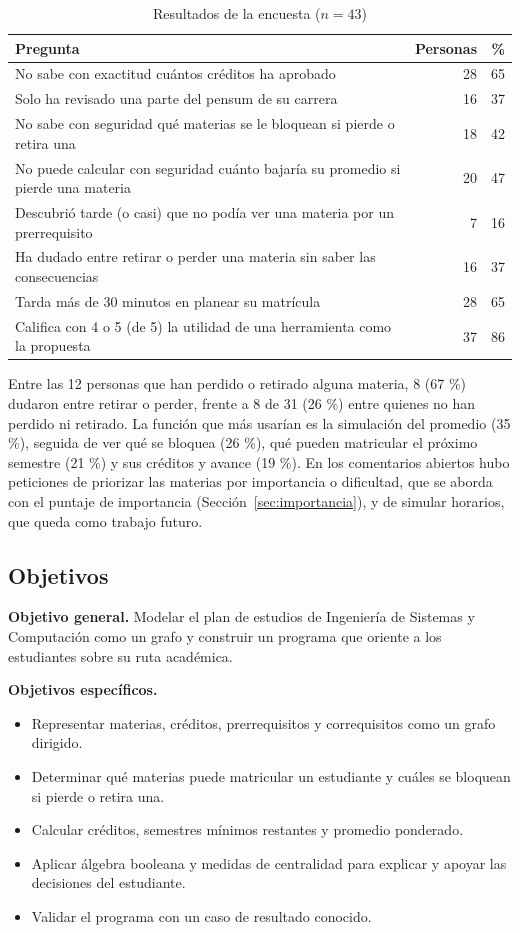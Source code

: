 \documentclass[11pt,a4paper]{article}
\begin{document}
\begin{table}[htbp]
\centering
\caption{Resultados de la encuesta ($n=43$)}
\label{tab:encuesta}
\begin{tabular}{p{9.6cm}rr}
\toprule
Pregunta & Personas & \% \\
\midrule
No sabe con exactitud cuántos créditos ha aprobado & 28 & 65 \\
Solo ha revisado una parte del pensum de su carrera & 16 & 37 \\
No sabe con seguridad qué materias se le bloquean si pierde o retira una & 18 & 42 \\
No puede calcular con seguridad cuánto bajaría su promedio si pierde una materia & 20 & 47 \\
Descubrió tarde (o casi) que no podía ver una materia por un prerrequisito & 7 & 16 \\
Ha dudado entre retirar o perder una materia sin saber las consecuencias & 16 & 37 \\
Tarda más de 30 minutos en planear su matrícula & 28 & 65 \\
Califica con 4 o 5 (de 5) la utilidad de una herramienta como la propuesta & 37 & 86 \\
\bottomrule
\end{tabular}
\end{table}

Entre las 12 personas que han perdido o retirado alguna materia, 8 (67 \%) dudaron entre retirar o perder, frente a 8 de 31 (26 \%) entre quienes no han perdido ni retirado. La función que más usarían es la simulación del promedio (35 \%), seguida de ver qué se bloquea (26 \%), qué pueden matricular el próximo semestre (21 \%) y sus créditos y avance (19 \%). En los comentarios abiertos hubo peticiones de priorizar las materias por importancia o dificultad, que se aborda con el puntaje de importancia (Sección~\ref{sec:importancia}), y de simular horarios, que queda como trabajo futuro.

\subsection{Objetivos}
\textbf{Objetivo general.} Modelar el plan de estudios de Ingeniería de Sistemas y Computación como un grafo y construir un programa que oriente a los estudiantes sobre su ruta académica.

\textbf{Objetivos específicos.}
\begin{itemize}
  \item Representar materias, créditos, prerrequisitos y correquisitos como un grafo dirigido.
  \item Determinar qué materias puede matricular un estudiante y cuáles se bloquean si pierde o retira una.
  \item Calcular créditos, semestres mínimos restantes y promedio ponderado.
  \item Aplicar álgebra booleana y medidas de centralidad para explicar y apoyar las decisiones del estudiante.
  \item Validar el programa con un caso de resultado conocido.
\end{itemize}
\end{document}

